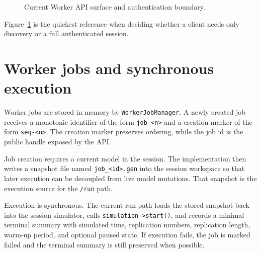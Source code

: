 \begin{figure}[htbp]
\centering
\caption{Current Worker API surface and authentication boundary.}
\label{fig:worker-architecture-api-surface}
\end{figure}

Figure~\ref{fig:worker-architecture-api-surface} is the quickest reference when deciding whether a client needs only discovery or a full authenticated session.

\section{Worker jobs and synchronous execution}
\label{sec:worker-architecture-jobs}

Worker jobs are stored in memory by \texttt{WorkerJobManager}. A newly created job receives a monotonic identifier of the form \texttt{job-<n>} and a creation marker of the form \texttt{seq-<n>}. The creation marker preserves ordering, while the job id is the public handle exposed by the API.

Job creation requires a current model in the session. The implementation then writes a snapshot file named \texttt{job\_<id>.gen} into the session workspace so that later execution can be decoupled from live model mutations. That snapshot is the execution source for the \texttt{/run} path.

Execution is synchronous. The current run path loads the stored snapshot back into the session simulator, calls \texttt{simulation->start()}, and records a minimal terminal summary with simulated time, replication numbers, replication length, warm-up period, and optional paused state. If execution fails, the job is marked failed and the terminal summary is still preserved when possible.

